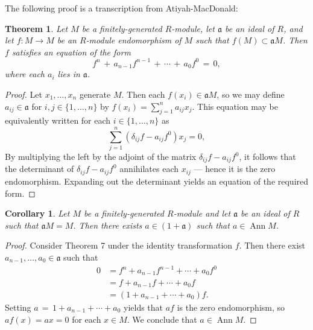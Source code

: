 \documentclass[11pt]{article}
\newtheorem{theorem}{Theorem}
\newtheorem{corollary}{Corollary}
\newcommand{\Ann}{\operatorname{Ann}}
\begin{document}
The following proof is a transcription from Atiyah-MacDonald:

\begin{adjustwidth}{0.5cm}{}
	\begin{theorem}
		Let $M$ be a finitely-generated $R$-module, let $\mathfrak{a}$ be an ideal of $R$, and let $f : M \to M$ be an $R$-module endomorphism of $M$ such that $f(M) \subset \mathfrak{a}M$. Then $f$ satisfies an equation of the form
		\[
			f^{n} \, + \, a_{n - 1} f^{n - 1} \, + \, \cdots \, + \, a_{0} f^{0} \, = \, 0,
		\]
		where each $a_{i}$ lies in $\mathfrak{a}$.
	\end{theorem}
	\begin{proof}
		Let $x_{1}, \ldots, x_{n}$ generate $M$. Then each $f(x_{i}) \in \mathfrak{a} M$, so we may define $a_{ij} \in \mathfrak{a}$ for $i, j \in \{ 1, \ldots, n \}$ by $f(x_{i}) = \sum_{j = 1}^{n} a_{ij}x_{j}$. This equation may be equivalently written for each $i \in \{ 1, \ldots, n \}$ as
		\[
			\sum\limits_{j = 1}^{n} (\delta_{ij} f - a_{ij} f^{0}) x_{j} = 0,
		\]
    By multiplying the left by the adjoint of the matrix $\delta_{ij} f - a_{ij} f^{0}$, it follows that the determinant of $\delta_{ij} f - a_{ij} f^{0}$ annihilates each $x_{ij}$ --- hence it is the zero endomorphism. Expanding out the determinant yields an equation of the required form.
	\end{proof}
\end{adjustwidth}

\begin{adjustwidth}{0.5cm}{}
	\begin{corollary}
		Let $M$ be a finitely-generated $R$-module and let $\mathfrak{a}$ be an ideal of $R$ such that $\mathfrak{a} M = M$. Then there exists $a \in (1 + \mathfrak{a})$ such that $a \in \Ann M$.
	\end{corollary}
	\begin{proof}
		Consider Theorem 7 under the identity transformation $f$. Then there exist $a_{n - 1}, \ldots, a_{0} \in \mathfrak{a}$ such that
		\begin{align*}
			0 &= f^{n} + a_{n - 1} f^{n - 1} + \cdots + a_{0} f^{0} \\
			&= f + a_{n - 1} f + \cdots + a_{0} f \\
			&= (1 + a_{n - 1} + \cdots + a_{0}) f.
		\end{align*}
		Setting $a \, = \, 1 + a_{n - 1} + \cdots + a_{0}$ yields that $a f$ is the zero endomorphism, so $a f(x) = ax = 0$ for each $x \in M$. We conclude that $a \in \Ann M$.
	\end{proof}
\end{adjustwidth}
\end{document}
